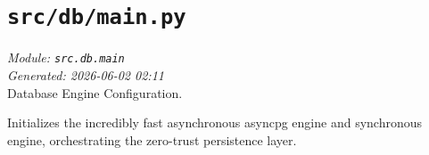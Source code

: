 
\section{\texttt{src/db/main.py}}
\textit{Module: \texttt{src.db.main}} \\
\textit{Generated: 2026-06-02 02:11} \\

Database Engine Configuration.

Initializes the incredibly fast asynchronous asyncpg engine and
synchronous engine, orchestrating the zero-trust persistence layer.
